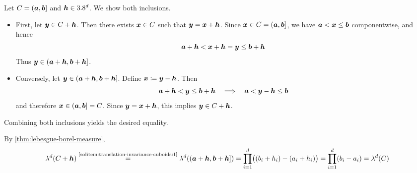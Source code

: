 \begin{solution}
\leavevmode
\begin{enumerate}[label={\protect\hyperref[exitem:translation-invariance-cuboids:\arabic*]{(\alph*)}}]
\item \label{solitem:translation-invariance-cuboids:1}
Let $C=({\boldsymbol{a}},{\boldsymbol{b}}]$ and ${\boldsymbol{h}}\in3.8^d$.
We show both inclusions.
\begin{itemize}
\item[$\subseteq$:]
First, let ${\boldsymbol{y}}\in C+{\boldsymbol{h}}$.
Then there exists ${\boldsymbol{x}}\in C$ such that ${\boldsymbol{y}}={\boldsymbol{x}}+{\boldsymbol{h}}$.
Since ${\boldsymbol{x}}\in C=({\boldsymbol{a}},{\boldsymbol{b}}]$, we have ${\boldsymbol{a}}<{\boldsymbol{x}}\leq {\boldsymbol{b}}$ componentwise, and hence
\[
{\boldsymbol{a}}+{\boldsymbol{h}}
<
{\boldsymbol{x}}+{\boldsymbol{h}}
=
{\boldsymbol{y}}
\leq
{\boldsymbol{b}}+{\boldsymbol{h}}
\]
Thus ${\boldsymbol{y}}\in ({\boldsymbol{a}}+{\boldsymbol{h}},{\boldsymbol{b}}+{\boldsymbol{h}}]$.
\item[$\supseteq$:]
Conversely, let ${\boldsymbol{y}}\in ({\boldsymbol{a}}+{\boldsymbol{h}},{\boldsymbol{b}}+{\boldsymbol{h}}]$.
Define ${\boldsymbol{x}}\coloneq {\boldsymbol{y}}-{\boldsymbol{h}}$.
Then
\[
{\boldsymbol{a}}+{\boldsymbol{h}}<{\boldsymbol{y}}\leq {\boldsymbol{b}}+{\boldsymbol{h}}
\quad\Longrightarrow\quad
{\boldsymbol{a}}<{\boldsymbol{y}}-{\boldsymbol{h}}\leq {\boldsymbol{b}}
\]
and therefore ${\boldsymbol{x}}\in ({\boldsymbol{a}},{\boldsymbol{b}}]=C$.
Since ${\boldsymbol{y}}={\boldsymbol{x}}+{\boldsymbol{h}}$, this implies ${\boldsymbol{y}}\in C+{\boldsymbol{h}}$.
\end{itemize}
Combining both inclusions yields the desired equality.

\item \label{solitem:translation-invariance-cuboids:2}
By 
\autoref{thm:lebesgue-borel-measure},
\[
\lambda^d(C+{\boldsymbol{h}})
\overset{\text{\ref{solitem:translation-invariance-cuboids:1}}}=
\lambda^d(({\boldsymbol{a}}+{\boldsymbol{h}},{\boldsymbol{b}}+{\boldsymbol{h}}]) 
=
\prod_{i=1}^d \bigl((b_i+h_i)-(a_i+h_i)\bigr) 
=
\prod_{i=1}^d (b_i-a_i)
=
\lambda^d(C)
\]


\end{enumerate}
\end{solution}
